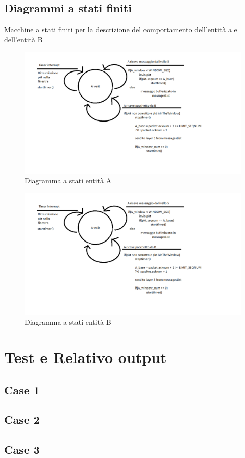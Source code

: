 \documentclass[a4paper]{article}
\begin{document}
\subsection{Diagrammi a stati finiti}
Macchine a stati finiti per la descrizione del comportamento dell'entità a e dell'entità B
\begin{figure}[h!]
\includegraphics[scale = 0.50]{Assigment3.png}
\caption{Diagramma a stati entità A}
\end{figure}
\newline
\begin{figure}[h!]
\includegraphics[scale = 0.50]{Assigment3.png}
\caption{Diagramma a stati entità B}
\end{figure}

\section{Test e Relativo output}
\subsection{Case 1}

\subsection{Case 2}

\subsection{Case 3}

\end{document}
